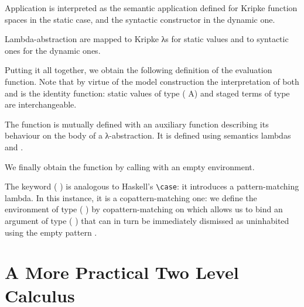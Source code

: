 Application is interpreted as the semantic application defined
for Kripke function spaces in the static case, and the syntactic
 constructor in the dynamic one.


Lambda-abstraction are mapped to Kripke λs for static values
and to syntactic ones for the dynamic ones.


Putting it all together, we obtain the following definition
of the evaluation function.
Note that by virtue of the model construction the interpretation
of both  and  is the identity function:
static values of type ( A) and staged terms of type 
are interchangeable.

\begin{AgdaSuppressSpace}
\end{AgdaSuppressSpace}

The function  is mutually defined with an auxiliary
function describing its behaviour on the body of a λ-abstraction.
It is defined using semantics lambdas and .

\begin{AgdaSuppressSpace}
\end{AgdaSuppressSpace}

We finally obtain the  function by calling  with an
empty environment.

\begin{AgdaSuppressSpace}
\end{AgdaSuppressSpace}

\begin{remark}
The keyword ( ) is analogous to Haskell's
\texttt{\textbackslash{}case}: it introduces a pattern-matching lambda.
In this instance, it is a copattern-matching one: we define
the environment of type (  ) by
copattern-matching on {} which allows us to bind
an argument of type (  ) that can in turn
be immediately dismissed as uninhabited using the empty pattern \AS{()}.
\end{remark}

\section{A More Practical Two Level Calculus}

